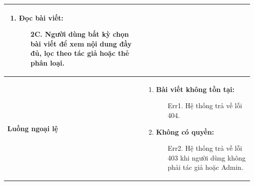 {\begin{tabularx}{\textwidth}{|>{\raggedright\arraybackslash}p{3.5cm}|>{\raggedright\arraybackslash}X|}
\begin{enumerate}
\begin{enumerate}
    \end{enumerate}
    \item \textbf{Đọc bài viết:}
    \begin{enumerate}
        \item[2C.] Người dùng bất kỳ chọn bài viết để xem nội dung đầy đủ, lọc theo tác giả hoặc thẻ phân loại.
    \end{enumerate}
\end{enumerate} \\
\hline
\textbf{Luồng ngoại lệ} &
\begin{enumerate}
    \item \textbf{Bài viết không tồn tại:}
    \begin{enumerate}
        \item[Err1.] Hệ thống trả về lỗi 404.
    \end{enumerate}
    \item \textbf{Không có quyền:}
    \begin{enumerate}
        \item[Err2.] Hệ thống trả về lỗi 403 khi người dùng không phải tác giả hoặc Admin.
    \end{enumerate}
\end{enumerate} \\
\hline
\end{tabularx}
}
